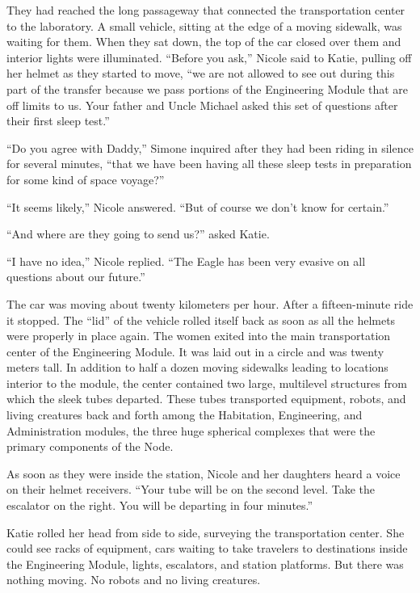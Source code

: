 \documentclass[]{article}
\begin{document}
{They had reached the long passageway that connected the transportation center to the laboratory. A small vehicle, sitting at the edge of a moving sidewalk, was waiting for them. When they sat down, the top of the car closed over them and interior lights were illuminated. “Before you ask,” Nicole said to Katie, pulling off her helmet as they started to move, “we are not allowed to see out during this part of the transfer because we pass portions of the Engineering Module that are off limits to us. Your father and Uncle Michael asked this set of questions after their first sleep test.”

“Do you agree with Daddy,” Simone inquired after they had been riding in silence for several minutes, “that we have been having all these sleep tests in preparation for some kind of space voyage?”

“It seems likely,” Nicole answered. “But of course we don’t know for certain.”

“And where are they going to send us?” asked Katie.

“I have no idea,” Nicole replied. “The Eagle has been very evasive on all questions about our future.”

The car was moving about twenty kilometers per hour. After a fifteen-minute ride it stopped. The “lid” of the vehicle rolled itself back as soon as all the helmets were properly in place again. The women exited into the main transportation center of the Engineering Module. It was laid out in a circle and was twenty meters tall. In addition to half a dozen moving sidewalks leading to locations interior to the module, the center contained two large, multilevel structures from which the sleek tubes departed. These tubes transported equipment, robots, and living creatures back and forth among the Habitation, Engineering, and Administration modules, the three huge spherical complexes that were the primary components of the Node.

As soon as they were inside the station, Nicole and her daughters heard a voice on their helmet receivers. “Your tube will be on the second level. Take the escalator on the right. You will be departing in four minutes.”

Katie rolled her head from side to side, surveying the transportation center. She could see racks of equipment, cars waiting to take travelers to destinations inside the Engineering Module, lights, escalators, and station platforms. But there was nothing moving. No robots and no living creatures.

}
\end{document}

